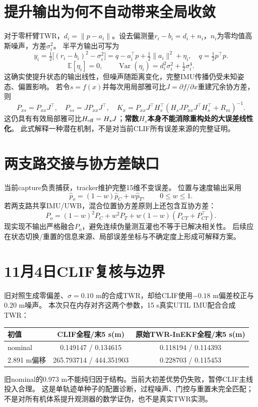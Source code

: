\documentclass[11pt,a4paper]{ctexart}
\begin{document}
\section{提升输出为何不自动带来全局收敛}
对于零杆臂TWR，$d_i=\|p-a_i\|$。设去偏测量$r_i-b_i=d_i+n_i$，$n_i$为零均值高斯噪声，方差$\sigma_i^2$。
半平方输出可写为
\begin{equation}
 y_i=\tfrac12\big[(r_i-b_i)^2-\sigma_i^2\big]
 =q-a_i^\top p+\tfrac12\|a_i\|^2+\eta_i,\quad q=\tfrac12p^\top p .
\end{equation}
\begin{equation}
 \mathbb E[\eta_i]=0,\qquad
 \operatorname{Var}(\eta_i)=d_i^2\sigma_i^2+\tfrac12\sigma_i^4 .
\end{equation}
这确实使提升状态的输出线性，但噪声随距离变化，完整IMU传播仍受未知姿态、偏置影响。
若令$s=f(x)$并每次用局部雅可比$J=\partial f/\partial x$重建冗余协方差，则
\begin{equation}
 P_{xs}=P_{xx}J^\top,\quad P_{ss}=JP_{xx}J^\top,\quad
 K_x=P_{xx}J^\top H_s^\top(H_sJP_{xx}J^\top H_s^\top+R_m)^{-1}.
\end{equation}
这仍具有有效局部雅可比$H_{\rm eff}=H_sJ$；\textbf{常数$H_s$本身不能消除重构处的大误差线性化}。
此式解释一种潜在机制，不是对当前CLIF所有误差来源的完整证明。

\newpage
\section{两支路交接与协方差缺口}
当前capture负责捕获，tracker维护完整15维不变误差。
位置与速度输出采用
\begin{equation}
 \hat p_o=(1-w)\hat p_C+w\hat p_T,\qquad 0\le w\le1.
\end{equation}
若两支路共享IMU/UWB，混合位置协方差原则上还包含互协方差：
\begin{equation}
 P_o=(1-w)^2P_C+w^2P_T+w(1-w)(P_{CT}+P_{CT}^\top).
\end{equation}
现实现不输出严格融合$P_o$，避免连续伪量测互灌也不等于已解决相关性。
后续应在状态切换/重置的信息来源、局部误差坐标与不确定度上形成可解释方案。

\section{11月4日CLIF复核与边界}
旧对照生成零偏差、$\sigma=0.10$ m的合成TWR，却给CLIF使用$-0.18$ m偏差校正与$0.20$ m噪声。
本次只在内存对齐这两个参数，15 s真实UTIL IMU配合合成TWR：
\begin{center}
\small
\begin{tabular}{lcc}
\toprule
初值 & CLIF全程/末5 s(m) & 原始TWR-InEKF全程/末5 s(m)\\
\midrule
nominal & 0.149147 / 0.134615 & 0.118194 / 0.114393\\
2.891 m偏移 & 265.793714 / 444.351903 & 0.228703 / 0.115453\\
\bottomrule
\end{tabular}
\end{center}
旧nominal的0.973 m不能纯归因于结构。当前大初差优势仍失败，暂停CLIF主线投入合理。
这是单轨迹单种子的配置诊断，过程噪声、门控与重置未完全匹配；不是对所有机体系提升观测器的数学证伪，也不是真实TWR实测。
\end{document}
